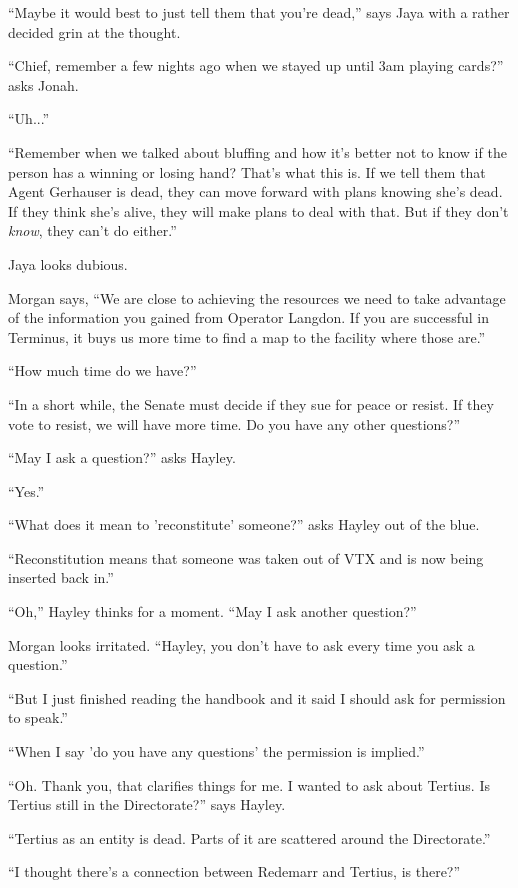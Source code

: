 ``Maybe it would best to just tell them that you're dead,'' says Jaya with a rather decided grin at the thought.

``Chief, remember a few nights ago when we stayed up until 3am playing cards?'' asks Jonah.

``Uh...''

``Remember when we talked about bluffing and how it's better not to know if the person has a winning or losing hand?  That's what this is.  If we tell them that Agent Gerhauser is dead, they can move forward with plans knowing she's dead.  If they think she's alive, they will make plans to deal with that. But if they don't \textit{know}, they can't do either.''

Jaya looks dubious.

Morgan says, ``We are close to achieving the resources we need to take advantage of the information you gained from Operator Langdon.  If you are successful in Terminus, it buys us more time to find a map to the facility where those are.''

``How much time do we have?''

``In a short while, the Senate must decide if they sue for peace or resist.  If they vote to resist, we will have more time.  Do you have any other questions?''

``May I ask a question?'' asks Hayley.

``Yes.''

``What does it mean to 'reconstitute' someone?'' asks Hayley out of the blue.

``Reconstitution means that someone was taken out of VTX and is now being inserted back in.'' 

``Oh,''  Hayley thinks for a moment.  ``May I ask another question?''

Morgan looks irritated.  ``Hayley, you don't have to ask every time you ask a question.''

``But I just finished reading the handbook and it said I should ask for permission to speak.''

``When I say 'do you have any questions' the permission is implied.''

``Oh.  Thank you, that clarifies things for me.  I wanted to ask about Tertius.  Is Tertius still in the Directorate?'' says Hayley.

``Tertius as an entity is dead.  Parts of it are scattered around the Directorate.''

``I thought there's a connection between Redemarr and Tertius, is there?''

